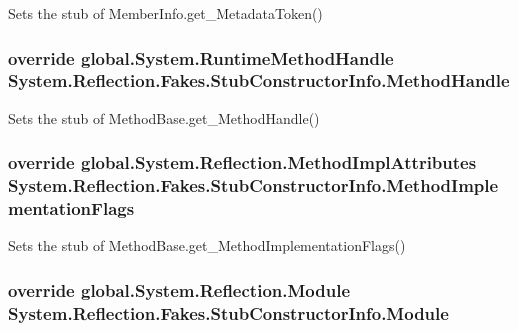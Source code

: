 Sets the stub of Member\-Info.\-get\-\_\-\-Metadata\-Token()

\hypertarget{class_system_1_1_reflection_1_1_fakes_1_1_stub_constructor_info_ac86be03b0144e7856f97e16e9ef71097}{
\subsubsection[{Method\-Handle}]{\setlength{\rightskip}{0pt plus 5cm}override global.\-System.\-Runtime\-Method\-Handle System.\-Reflection.\-Fakes.\-Stub\-Constructor\-Info.\-Method\-Handle\hspace{0.3cm}{\ttfamily [get]}}}\label{class_system_1_1_reflection_1_1_fakes_1_1_stub_constructor_info_ac86be03b0144e7856f97e16e9ef71097}


Sets the stub of Method\-Base.\-get\-\_\-\-Method\-Handle()

\hypertarget{class_system_1_1_reflection_1_1_fakes_1_1_stub_constructor_info_a124ee60f0503860801433102fa1bbe5e}{
\subsubsection[{Method\-Implementation\-Flags}]{\setlength{\rightskip}{0pt plus 5cm}override global.\-System.\-Reflection.\-Method\-Impl\-Attributes System.\-Reflection.\-Fakes.\-Stub\-Constructor\-Info.\-Method\-Implementation\-Flags\hspace{0.3cm}{\ttfamily [get]}}}\label{class_system_1_1_reflection_1_1_fakes_1_1_stub_constructor_info_a124ee60f0503860801433102fa1bbe5e}


Sets the stub of Method\-Base.\-get\-\_\-\-Method\-Implementation\-Flags()

\hypertarget{class_system_1_1_reflection_1_1_fakes_1_1_stub_constructor_info_a43b7b362d806e9da2a694d1d3d6d51d9}{
\subsubsection[{Module}]{\setlength{\rightskip}{0pt plus 5cm}override global.\-System.\-Reflection.\-Module System.\-Reflection.\-Fakes.\-Stub\-Constructor\-Info.\-Module\hspace{0.3cm}{\ttfamily [get]}}}\label{class_system_1_1_reflection_1_1_fakes_1_1_stub_constructor_info_a43b7b362d806e9da2a694d1d3d6d51d9}


